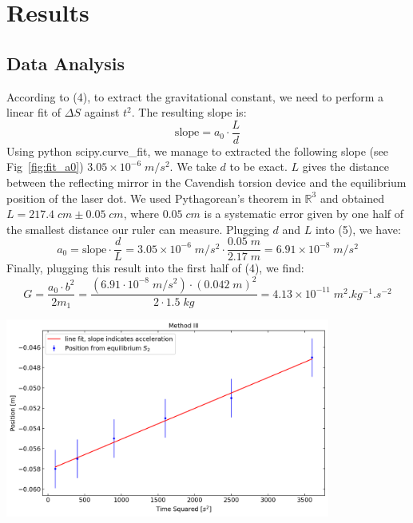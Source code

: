 \documentclass{article}
\begin{document}
\section{Results}

\subsection{Data Analysis}

    According to (4), to extract the gravitational constant, we need to perform a linear fit of $\Delta S$ against $t^2$. The resulting slope is: 
        \begin{equation}
              \text{slope} = a_0 \cdot \frac{L}{d}
        \end{equation}
Using python scipy.curve\_fit, we manage to extracted the following slope (see Fig~\ref{fig:fit_a0}) $ 3.05 \times 10^{-6} \; \si{m/s^2}$. We take $d$ to be exact. $L$ gives the distance between the reflecting mirror in the Cavendish torsion device and the equilibrium position of the laser dot. We used Pythagorean's theorem in $\mathbb{R}^3$ and obtained $L = 217.4 \; \si{cm} \pm 0.05 \; \si{cm}$, where $0.05 \; \si{cm}$ is a systematic error given by one half of the smallest distance our ruler can measure. Plugging $d$ and $L$ into (5), we have:
    \begin{equation}
        a_0 = \text{slope} \cdot \frac{d}{L} = 3.05 \times 10^{-6} \; \si{m/s^2} \cdot \frac{0.05 \; \si{m}}{2.17 \; \si{m}} = 6.91 \times 10^{-8} \; \si{m/s^2}
    \end{equation}
Finally, plugging this result into the first half of (4), we find:
    \begin{equation}
        G = \frac{a_0 \cdot b^2}{2 m_1} = \frac{(6.91\cdot10^{-8}\; \si{m/s^2}) \cdot (0.042\; \si{m})^2}{2 \cdot 1.5\; \si{kg}} = 4.13 \times 10^{-11} \; \si{m^2.kg^{-1}.s^{-2}}
    \end{equation}
    
\begin{center}
    \includegraphics[width = 0.8\textwidth]{figures/Method III fit.png}
    \label{fig:fit_a0}
\end{center}
\end{document}
